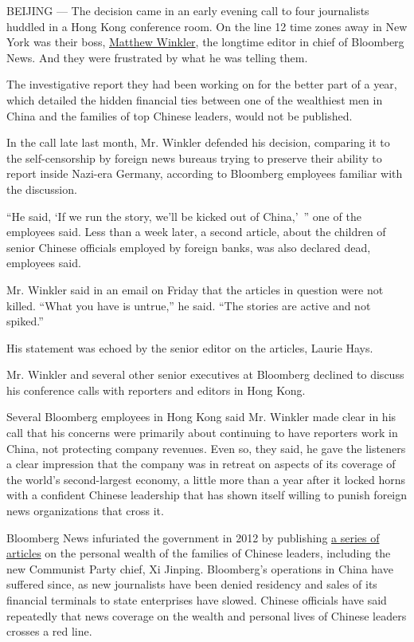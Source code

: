 BEIJING --- The decision came in an early evening call to four
journalists huddled in a Hong Kong conference room. On the line 12 time
zones away in New York was their boss,
\href{http://www.bloomberg.com/now/people/matthew-winkler/}{Matthew
Winkler}, the longtime editor in chief of Bloomberg News. And they were
frustrated by what he was telling them.

The investigative report they had been working on for the better part of
a year, which detailed the hidden financial ties between one of the
wealthiest men in China and the families of top Chinese leaders, would
not be published.

In the call late last month, Mr. Winkler defended his decision,
comparing it to the self-censorship by foreign news bureaus trying to
preserve their ability to report inside Nazi-era Germany, according to
Bloomberg employees familiar with the discussion.

``He said, `If we run the story, we'll be kicked out of China,'~'' one
of the employees said. Less than a week later, a second article, about
the children of senior Chinese officials employed by foreign banks, was
also declared dead, employees said.

Mr. Winkler said in an email on Friday that the articles in question
were not killed. ``What you have is untrue,'' he said. ``The stories are
active and not spiked.''

His statement was echoed by the senior editor on the articles, Laurie
Hays.

Mr. Winkler and several other senior executives at Bloomberg declined to
discuss his conference calls with reporters and editors in Hong Kong.

Several Bloomberg employees in Hong Kong said Mr. Winkler made clear in
his call that his concerns were primarily about continuing to have
reporters work in China, not protecting company revenues. Even so, they
said, he gave the listeners a clear impression that the company was in
retreat on aspects of its coverage of the world's second-largest
economy, a little more than a year after it locked horns with a
confident Chinese leadership that has shown itself willing to punish
foreign news organizations that cross it.

Bloomberg News infuriated the government in 2012 by publishing
\href{http://www.bloomberg.com/news/2012-06-29/xi-jinping-millionaire-relations-reveal-fortunes-of-elite.html}{a
series of articles} on the personal wealth of the families of Chinese
leaders, including the new Communist Party chief, Xi Jinping.
Bloomberg's operations in China have suffered since, as new journalists
have been denied residency and sales of its financial terminals to state
enterprises have slowed. Chinese officials have said repeatedly that
news coverage on the wealth and personal lives of Chinese leaders
crosses a red line.

